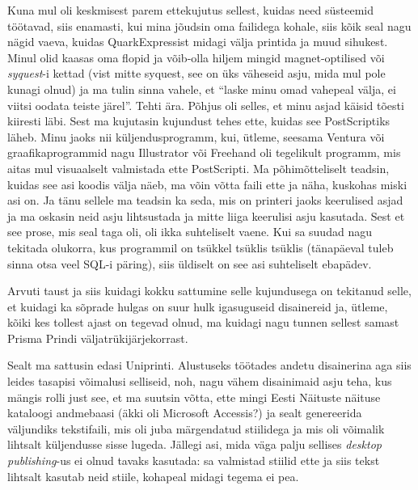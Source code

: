 Kuna mul oli  keskmisest parem ettekujutus sellest, kuidas need süsteemid 
töötavad, siis enamasti,  kui mina jõudsin oma failidega kohale, siis kõik seal 
nagu nägid vaeva, kuidas QuarkExpressist midagi välja printida ja muud 
sihukest. Minul olid kaasas oma flopid ja võib-olla hiljem mingid 
magnet-optilised või  \emph{syquest}-i kettad (vist mitte syquest, see 
on üks väheseid asju, mida mul pole kunagi olnud) ja ma tulin sinna vahele, et 
\enquote{laske minu omad vahepeal välja, ei viitsi oodata teiste järel}. Tehti 
ära. Põhjus oli selles,  et minu asjad käisid tõesti kiiresti läbi. Sest ma 
kujutasin kujundust tehes ette, kuidas see PostScriptiks läheb. Minu jaoks nii 
küljendusprogramm, kui, ütleme, seesama Ventura või graafikaprogrammid nagu 
Illustrator või Freehand oli tegelikult programm, mis aitas mul visuaalselt 
valmistada ette PostScripti. Ma põhimõtteliselt teadsin, kuidas see asi koodis 
välja näeb, ma võin võtta faili ette ja näha, kuskohas miski asi on. Ja tänu 
sellele ma teadsin ka seda, mis on printeri jaoks keerulised asjad ja ma 
oskasin neid asju lihtsustada ja mitte liiga keerulisi asju kasutada. Sest et 
see prose, mis seal taga oli, oli ikka suhteliselt vaene. Kui sa suudad nagu 
tekitada olukorra, kus programmil on tsükkel tsüklis tsüklis (tänapäeval tuleb 
sinna otsa veel SQL-i päring), siis üldiselt on see asi suhteliselt ebapädev.  

Arvuti taust ja siis kuidagi kokku sattumine selle kujundusega on tekitanud 
selle, et kuidagi ka sõprade hulgas on suur hulk igasuguseid disainereid ja, 
ütleme, kõiki kes tollest ajast on tegevad olnud, ma kuidagi nagu tunnen 
sellest samast Prisma Prindi väljatrükijärjekorrast. 

Sealt ma sattusin edasi Uniprinti. Alustuseks töötades andetu disainerina aga 
siis leides tasapisi võimalusi selliseid, noh, nagu vähem disainimaid asju 
teha, kus mängis rolli just see, et ma suutsin võtta, ette mingi Eesti Näituste 
näituse kataloogi andmebaasi (äkki oli Microsoft Accessis?) ja sealt 
genereerida väljundiks tekstifaili, mis oli juba märgendatud stiilidega ja mis 
oli võimalik lihtsalt küljendusse sisse lugeda. Jällegi asi, mida väga palju 
sellises \emph{desktop publishing}-us ei olnud tavaks kasutada: sa  valmistad 
stiilid ette ja siis tekst lihtsalt kasutab neid stiile, kohapeal midagi tegema 
ei pea.


